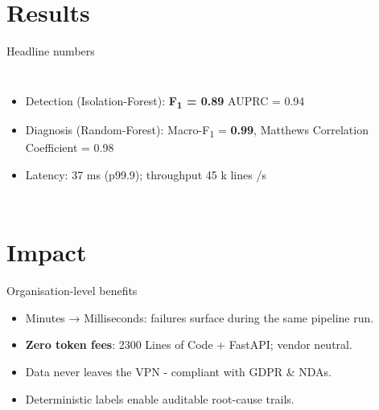 \documentclass[14pt,aspectratio=169]{beamer}  %
\newcommand{\IForest}{Isolation-Forest\xspace}
\newcommand{\RForest}{Random-Forest\xspace}
\newcommand{\LOC}{Lines of Code\xspace}
\begin{document}
\section{Results}
\begin{frame}{Headline numbers}
\begin{columns}
\small
\begin{itemize}[<+->]
  \item Detection (\IForest): \textbf{F\textsubscript{1} = 0.89}  \newline
        AUPRC = 0.94
  \item Diagnosis (\RForest): Macro-F\textsubscript{1} = \textbf{0.99}, \newline
        Matthews Correlation Coefficient = 0.98
  \item Latency: 37 ms (p99.9); throughput 45 k lines /s
\end{itemize}

\centering
\begin{adjustbox}{max width=\linewidth}
\end{adjustbox}
\end{columns}
\end{frame}

\section{Impact}
\begin{frame}{Organisation-level benefits}
\begin{itemize}[<+->]
  \item \alert{Minutes → Milliseconds}: failures surface during the same pipeline run.
  \item \textbf{Zero token fees}: 2300 \LOC{} + FastAPI; vendor neutral.
  \item Data never leaves the VPN - compliant with GDPR \& NDAs.
  \item Deterministic labels enable auditable root-cause trails.
\end{itemize}
\end{frame}
\end{document}
